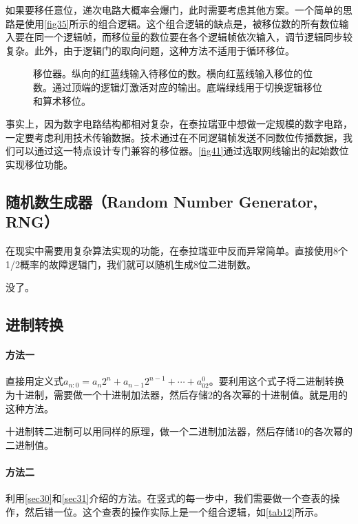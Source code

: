 如果要移任意位，递次电路大概率会爆门，此时需要考虑其他方案。一个简单的思路是使用\autoref{fig35}所示的组合逻辑。这个组合逻辑的缺点是，被移位数的所有数位输入要在同一个逻辑帧，而移位量的数位要在各个逻辑帧依次输入，调节逻辑同步较复杂。此外，由于逻辑门的取向问题，这种方法不适用于循环移位。

\begin{figure}[!ht]
  \centering
  \caption{移位器。纵向的红蓝线输入待移位的数。横向红蓝线输入移位的位数。通过顶端的逻辑灯激活对应的输出。底端绿线用于切换逻辑移位和算术移位。}\label{fig41}
\end{figure}

事实上，因为数字电路结构都相对复杂，在泰拉瑞亚中想做一定规模的数字电路，一定要考虑利用技术传输数据。技术通过在不同逻辑帧发送不同数位传播数据，我们可以通过这一特点设计专门兼容的移位器。\autoref{fig41}通过选取网线输出的起始数位实现移位功能。

\subsection{随机数生成器（Random Number Generator, RNG）}
在现实中需要用复杂算法实现的功能，在泰拉瑞亚中反而异常简单。直接使用8个1/2概率的故障逻辑门，我们就可以随机生成8位二进制数。
\vspace{5cm}

没了。

\subsection{进制转换}

\paragraph*{方法一} 直接用定义式$a_{n:0}=a_n2^n+a_{n-1}2^{n-1}+\cdots+a_02^0$。要利用这个式子将二进制转换为十进制，需要做一个十进制加法器，然后存储2的各次幂的十进制值。就是用的这种方法。

十进制转二进制可以用同样的原理，做一个二进制加法器，然后存储10的各次幂的二进制值。

\paragraph*{方法二} 利用\autoref{sec30}和\autoref{sec31}介绍的方法。在竖式的每一步中，我们需要做一个查表的操作，然后错一位。这个查表的操作实际上是一个组合逻辑，如\autoref{tab12}所示。

